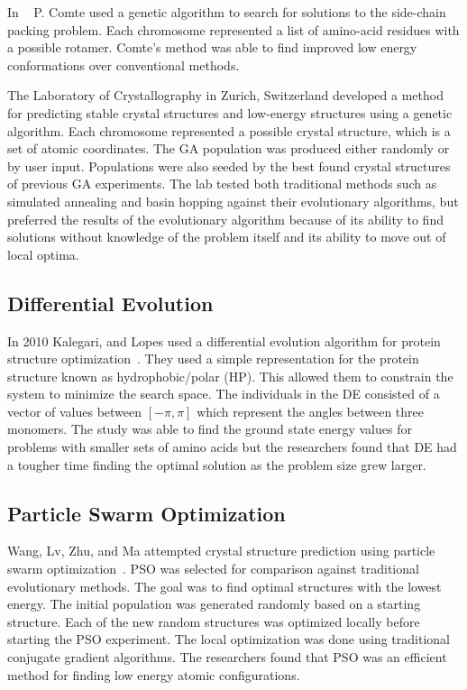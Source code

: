In ~\cite{comte2010bio} P. Comte used a genetic algorithm to search for solutions to the side-chain packing problem. Each chromosome represented a list of amino-acid residues with a possible rotamer. Comte's method was able to find improved low energy conformations over conventional methods.

The Laboratory of Crystallography in Zurich, Switzerland developed a method~\cite{oganov2006crystal} for predicting stable crystal structures and low-energy structures using a genetic algorithm. Each chromosome represented a possible crystal structure, which is a set of atomic coordinates. The GA population was produced either randomly or by user input. Populations were also seeded by the best found crystal structures of previous GA experiments. The lab tested both traditional methods such as simulated annealing and basin hopping against their evolutionary algorithms, but preferred the results of the evolutionary algorithm because of its ability to find solutions without knowledge of the problem itself and its ability to move out of local optima.

\subsection{Differential Evolution}

In 2010 Kalegari, and Lopes used a differential evolution algorithm for protein structure optimization~\cite{kalegari2010differential}. They used a simple representation for the protein structure known as hydrophobic/polar (HP). This allowed them to constrain the system to minimize the search space. The individuals in the DE consisted of a vector of values between $[-\pi, \pi]$ which represent the angles between three monomers. The study was able to find the ground state energy values for problems with smaller sets of amino acids but the researchers found that DE had a tougher time finding the optimal solution as the problem size grew larger.

\subsection{Particle Swarm Optimization}

Wang, Lv, Zhu, and Ma attempted crystal structure prediction using particle swarm optimization~\cite{wang2010crystal}. PSO was selected for comparison against traditional evolutionary methods. The goal was to find optimal structures with the lowest energy. The initial population was generated randomly based on a starting structure. Each of the new random structures was optimized locally before starting the PSO experiment. The local optimization was done using traditional conjugate gradient algorithms. The researchers found that PSO was an efficient method for finding low energy atomic configurations.